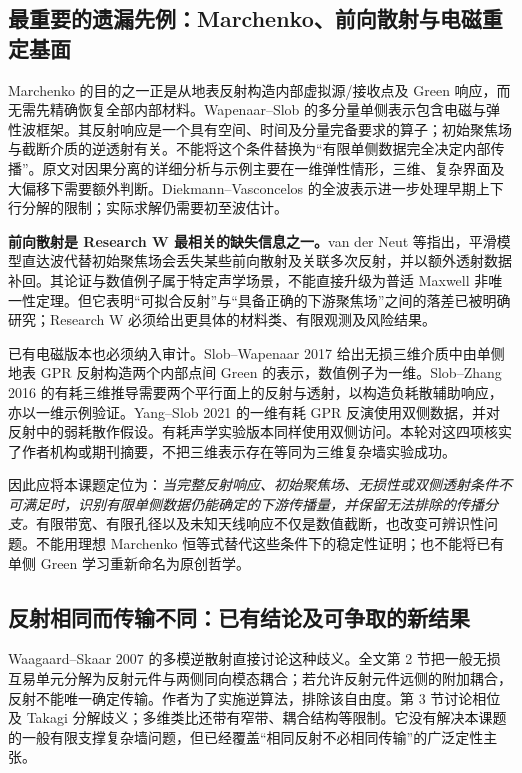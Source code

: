 \subsection{最重要的遗漏先例：Marchenko、前向散射与电磁重定基面}

Marchenko 的目的之一正是从地表反射构造内部虚拟源/接收点及 Green 响应，而无需先精确恢复全部内部材料。Wapenaar--Slob 的多分量单侧表示包含电磁与弹性波框架\cite{L_Marchenko14}。其反射响应是一个具有空间、时间及分量完备要求的算子；初始聚焦场与截断介质的逆透射有关。不能将这个条件替换为“有限单侧数据完全决定内部传播”。原文对因果分离的详细分析与示例主要在一维弹性情形，三维、复杂界面及大偏移下需要额外判断。Diekmann--Vasconcelos 的全波表示进一步处理早期上下行分解的限制；实际求解仍需要初至波估计\cite{L_Marchenko21}。

\textbf{前向散射是 Research W 最相关的缺失信息之一。}van der Neut 等指出，平滑模型直达波代替初始聚焦场会丢失某些前向散射及关联多次反射，并以额外透射数据补回\cite{L_Marchenko22}。其论证与数值例子属于特定声学场景，不能直接升级为普适 Maxwell 非唯一性定理。但它表明“可拟合反射”与“具备正确的下游聚焦场”之间的落差已被明确研究；Research W 必须给出更具体的材料类、有限观测及风险结果。

已有电磁版本也必须纳入审计。Slob--Wapenaar 2017 给出无损三维介质中由单侧地表 GPR 反射构造两个内部点间 Green 的表示，数值例子为一维\cite{L_EM2017}。Slob--Zhang 2016 的有耗三维推导需要两个平行面上的反射与透射，以构造负耗散辅助响应，亦以一维示例验证\cite{L_EM2016}。Yang--Slob 2021 的一维有耗 GPR 反演使用双侧数据，并对反射中的弱耗散作假设\cite{L_EM2021}。有耗声学实验版本同样使用双侧访问\cite{L_Dissipative18}。本轮对这四项核实了作者机构或期刊摘要，不把三维表示存在等同为三维复杂墙实验成功。

因此应将本课题定位为：\emph{当完整反射响应、初始聚焦场、无损性或双侧透射条件不可满足时，识别有限单侧数据仍能确定的下游传播量，并保留无法排除的传播分支。}有限带宽、有限孔径以及未知天线响应不仅是数值截断，也改变可辨识性问题。不能用理想 Marchenko 恒等式替代这些条件下的稳定性证明；也不能将已有单侧 Green 学习重新命名为原创哲学。

\subsection{反射相同而传输不同：已有结论及可争取的新结果}

Waagaard--Skaar 2007 的多模逆散射直接讨论这种歧义\cite{L_Waagaard}。全文第 2 节把一般无损互易单元分解为反射元件与两侧同向模态耦合；若允许反射元件远侧的附加耦合，反射不能唯一确定传输。作者为了实施逆算法，排除该自由度。第 3 节讨论相位及 Takagi 分解歧义；多维类比还带有窄带、耦合结构等限制。它没有解决本课题的一般有限支撑复杂墙问题，但已经覆盖“相同反射不必相同传输”的广泛定性主张。

